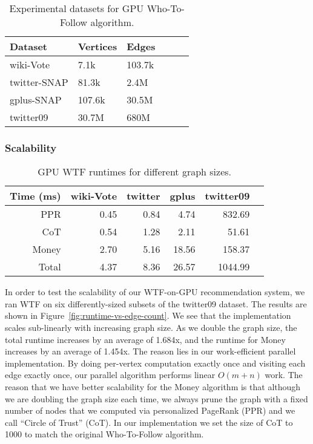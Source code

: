 \documentclass[format=acmsmall,review=false,screen=true]{acmart}
\begin{document}
\begin{table}
\centering
\caption{Experimental datasets for GPU Who-To-Follow
  algorithm.\label{tab:wtf:dataset}}
\begin{tabular}{*{6}{l}}
\toprule Dataset & Vertices&Edges \\
\midrule wiki-Vote & 7.1k & 103.7k \\
twitter-SNAP & 81.3k & 2.4M \\
gplus-SNAP & 107.6k & 30.5M \\
twitter09 & 30.7M & 680M \\
\bottomrule
\end{tabular}
\end{table}

\subsubsection{Scalability}

\begin{table}
\centering
\caption{GPU WTF runtimes for different graph
  sizes.\label{tab:wtf:runtimes}}
\begin{tabular}{*{6}{r}}
\toprule Time (ms) & wiki-Vote & twitter & gplus & twitter09 \\
\midrule PPR & 0.45 & 0.84 & 4.74 & 832.69\\
CoT & 0.54 & 1.28 & 2.11 & 51.61\\
Money & 2.70 & 5.16 & 18.56 & 158.37\\
Total & 4.37 & 8.36 & 26.57 & 1044.99\\
\bottomrule
\end{tabular}
\end{table}

In order to test the scalability of our WTF-on-GPU recommendation
system, we ran WTF on six differently-sized subsets of the twitter09
dataset. The results are shown in
Figure~\ref{fig:runtime-vs-edge-count}. We see that the implementation
scales sub-linearly with increasing graph size. As we double the graph
size, the total runtime increases by an average of 1.684x, and the
runtime for Money increases by an average of 1.454x. The reason lies
in our work-efficient parallel implementation. By doing per-vertex
computation exactly once and visiting each edge exactly once, our
parallel algorithm performs linear $O(m+n)$ work. The reason that we
have better scalability for the Money algorithm is that although we
are doubling the graph size each time, we always prune the graph with
a fixed number of nodes that we computed via personalized PageRank
(PPR) and we call ``Circle of Trust'' (CoT). In our implementation we
set the size of CoT to 1000 to match the original Who-To-Follow algorithm.
\end{document}
